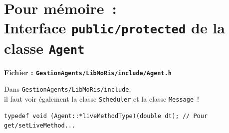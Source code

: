 \documentclass[12pt]{article}
\begin{document}
\section{Pour m\'emoire~:\\
Interface {\tt public/protected} de la classe {\tt Agent}}

\begin{center}
{\bf Fichier : {\tt GestionAgents/LibMoRis/include/Agent.h}}
\end{center}

\vspace{0.1cm}
Dans {\tt GestionAgents/LibMoRis/include},\\
il faut voir \'egalement la classe {\tt Scheduler} et la classe
{\tt Message}~!

\vspace{0.3cm}
\begin{small}
\begin{verbatim}
typedef void (Agent::*liveMethodType)(double dt); // Pour get/setLiveMethod...


\end{verbatim}
\end{small}
\end{document}
